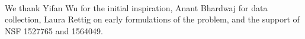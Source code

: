\\
 We thank Yifan Wu for the initial inspiration, Anant Bhardwaj for data collection, Laura Rettig on early formulations of the problem, and the support of NSF 1527765 and 1564049.